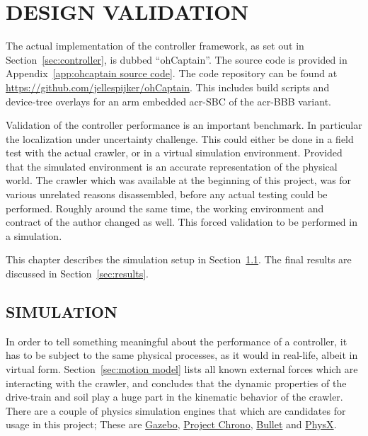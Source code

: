 \chapter{DESIGN VALIDATION}\label{chap:design validation}

The actual implementation of the controller framework, as set out in Section~\ref{sec:controller}, is dubbed
``ohCaptain''. The source code is provided in Appendix~\ref{app:ohcaptain source code}. The code repository can be found
at \url{https://github.com/jellespijker/ohCaptain}. This includes build scripts and device-tree overlays for an arm
embedded \gls{acr-SBC} of the \gls{acr-BBB} variant.

Validation of the controller performance is an important benchmark. In particular the localization under uncertainty
challenge. This could either be done in a field test with the actual crawler, or in a virtual simulation environment.
Provided that the simulated environment is an accurate representation of the physical world. The crawler which was
available at the beginning of this project, was for various unrelated reasons disassembled, before any actual testing
could be performed. Roughly around the same time, the working environment and contract of the author changed as well.
This forced validation to be performed in a simulation.

\noindent This chapter describes the simulation setup in Section~\ref{sec:simulation}. The final results are discussed
in Section~\ref{sec:results}.

\section{SIMULATION}\label{sec:simulation}

In order to tell something meaningful about the performance of a controller, it has to be subject to the same physical
processes, as it would in real-life, albeit in virtual form. Section~\ref{sec:motion model} lists all known external
forces which are interacting with the crawler, and concludes that the dynamic properties of the drive-train and soil
play a huge part in the kinematic behavior of the crawler. There are a couple of physics simulation engines that which
are candidates for usage in this project; These are \href{http://gazebosim.org/}{Gazebo},
\href{https://projectchrono.org/}{Project Chrono}, \href{https://pybullet.org/wordpress/}{Bullet} and
\href{https://developer.nvidia.com/gameworks-physx-overview}{PhysX}.

